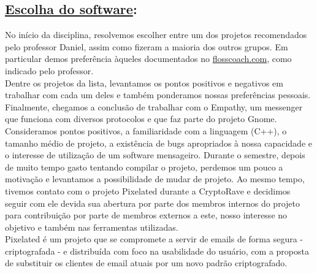 \subsection*{\underline{Escolha do software}:}
No início da disciplina, resolvemos escolher entre um dos projetos 
recomendados pelo professor Daniel, assim como fizeram a maioria dos outros 
grupos. Em particular demos preferência àqueles documentados no 
\url{flosscoach.com}, como indicado pelo professor. \\
Dentre os projetos da lista, levantamos os pontos positivos e negativos 
em trabalhar com cada um deles e também ponderamos nossas preferências 
pessoais. Finalmente, chegamos a conclusão de trabalhar com o Empathy, um 
messenger que funciona com diversos protocolos e que faz parte do projeto 
Gnome. \\
Consideramos pontos positivos, a familiaridade com a linguagem (C++), o 
tamanho médio de projeto, a existência de bugs apropriados à nossa capacidade e 
o interesse de utilização de um software mensageiro. Durante o semestre, depois 
de muito tempo gasto tentando compilar o projeto, perdemos um pouco a motivação 
e levantamos a possibilidade de mudar de projeto.  Ao mesmo tempo, tivemos 
contato com o projeto Pixelated durante a CryptoRave e decidimos seguir com ele 
devida sua abertura por parte dos membros internos do projeto para contribuição 
por parte de membros externos a este, nosso interesse no objetivo e também nas 
ferramentas utilizadas. \\
Pixelated é um projeto que se compromete a servir de emails de forma segura - 
criptografada - e distribuída com foco na usabilidade do usuário, com a 
proposta de substituir os clientes de email atuais por um novo padrão 
criptografado.

